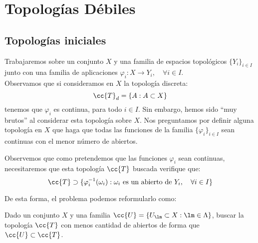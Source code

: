 \chapter{Topologías Débiles}
\section{Topologías iniciales}
\noindent
Trabajaremos sobre un conjunto $X$ y una familia de espacios topológicos $\{Y_i\}_{i \in I}$ junto con una familia de aplicaciones $\varphi_i:X\to Y_i, \quad \forall i \in I$.\\

\noindent
Observamos que si consideramos en $X$ la topología discreta:
\begin{equation*}
    \cc{T}_d = \{A : A\subset X\}
\end{equation*}
tenemos que $\varphi_i$ es continua, para todo $i \in I$. Sin embargo, hemos sido ``muy brutos'' al considerar esta topología sobre $X$. Nos preguntamos por definir alguna topología en $X$ que haga que todas las funciones de la familia $\{\varphi_i\}_{i \in I}$ sean continuas con el menor número de abiertos.

\begin{observacion}
    Observemos que como pretendemos que las funciones $\varphi_i$ sean continuas, necesitaremos que esta topología $\cc{T}$ buscada verifique que:
    \begin{equation*}
        \cc{T} \supset \{\varphi_i^{-1}(\omega_i) : \omega_i \text{\ es un abierto de\ } Y_i, \quad \forall i \in I\}
    \end{equation*}
\end{observacion}
\noindent
De esta forma, el problema podemos reformularlo como:

\begin{center}
    Dado un conjunto $X$ y una familia $\cc{U} = \{U_\lm\subset X : \lm \in \Lambda\}$, buscar la topología $\cc{T}$ con menos cantidad de abiertos de forma que $\cc{U}\subset \cc{T}$.
\end{center}

